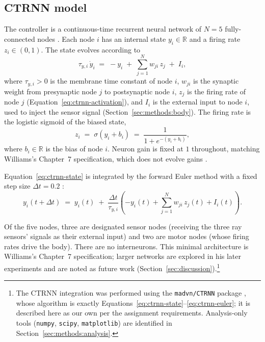 \subsection{CTRNN model}
\label{sec:methods:ctrnn}

The controller is a continuous-time recurrent neural network of $N = 5$
fully-connected nodes \parencite{beer1995}. Each node $i$ has an internal state
$y_i \in \mathbb{R}$ and a firing rate $z_i \in (0, 1)$. The state evolves
according to
%
\begin{equation}
  \tau_{y,i}\, \dot{y}_i \;=\; -y_i \;+\; \sum_{j=1}^{N} w_{ji}\, z_j \;+\; I_i,
  \label{eq:ctrnn-state}
\end{equation}
%
where $\tau_{y,i} > 0$ is the membrane time constant of node $i$, $w_{ji}$ is
the synaptic weight from presynaptic node $j$ to postsynaptic node $i$, $z_j$ is
the firing rate of node $j$ (Equation~\ref{eq:ctrnn-activation}), and $I_i$ is
the external input to node $i$, used to inject the sensor signal
(Section~\ref{sec:methods:body}). The firing rate is the logistic sigmoid of the
biased state,
%
\begin{equation}
  z_i \;=\; \sigma(y_i + b_i) \;=\; \frac{1}{1 + e^{-(y_i + b_i)}},
  \label{eq:ctrnn-activation}
\end{equation}
%
where $b_i \in \mathbb{R}$ is the bias of node $i$. Neuron gain is fixed at $1$
throughout, matching Williams's Chapter~7 specification, which does not evolve
gains \parencite{williams2006}.

Equation~\ref{eq:ctrnn-state} is integrated by the forward Euler method with a
fixed step size $\Delta t = 0.2$ \parencite{williams2006}:
%
\begin{equation}
  y_i(t + \Delta t) \;=\; y_i(t)
  \;+\; \frac{\Delta t}{\tau_{y,i}}
  \left( -y_i(t) + \sum_{j=1}^{N} w_{ji}\, z_j(t) + I_i(t) \right).
  \label{eq:ctrnn-euler}
\end{equation}

Of the five nodes, three are designated sensor nodes (receiving the three ray
sensors' signals as their external input) and two are motor nodes (whose firing
rates drive the body). There are no interneurons. This minimal architecture is
Williams's Chapter~7 specification; larger networks are explored in his later
experiments and are noted as future work
(Section~\ref{sec:discussion}).\footnote{The CTRNN integration was performed
using the \texttt{madvn/CTRNN} package \parencite{candadai2020}, whose
algorithm is exactly Equations~\ref{eq:ctrnn-state}--\ref{eq:ctrnn-euler}; it is
described here as our own per the assignment requirements. Analysis-only tools
(\texttt{numpy}, \texttt{scipy}, \texttt{matplotlib}) are identified in
Section~\ref{sec:methods:analysis}.}

